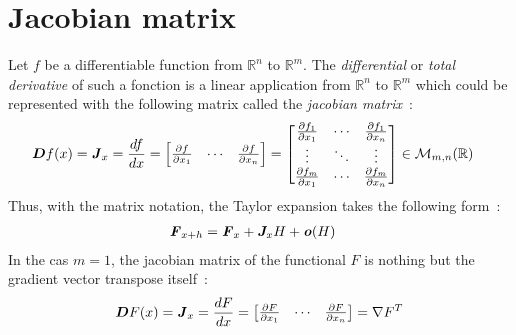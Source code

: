 \section{Jacobian matrix}
Let $f$ be a differentiable function from $\mathbb{R}^n$ to $\mathbb{R}^m$. The \emph{differential} or \emph{total derivative} of such a fonction is a linear application from $\mathbb{R}^n$ to $\mathbb{R}^m$ which could be represented with the following matrix called the \emph{jacobian matrix}~:
\begin{align}
	&\boldsymbol{D}f(x) = \boldsymbol{\mathit{J}}_x = \frac{df}{dx} =
	\begin{bmatrix}
		\frac{\partial f}{\partial x_1}&\cdots&\frac{\partial f}{\partial x_n}
	\end{bmatrix}=
	\begin{bmatrix}
		\frac{\partial f_1}{\partial x_1} & \cdots & \frac{\partial f_1}{\partial x_n} \\
		\vdots & \ddots & \vdots \\
		\frac{\partial f_m}{\partial x_1} & \cdots & \frac{\partial f_m}{\partial x_n}
	\end{bmatrix}
	\in\mathcal{M}_{m,n}(\mathbb{R})
\end{align}
Thus, with the matrix notation, the Taylor expansion takes the following form~:
\begin{align}
	&\boldsymbol{\mathit{F}}_{x+h} = \boldsymbol{\mathit{F}}_{x} +  \boldsymbol{J}_x H + \boldsymbol{\mathit{o}}(H)
\end{align}
In the cas $m=1$, the jacobian matrix of the functional $F$ is nothing but the gradient vector transpose itself~:
\begin{align}
	\boldsymbol{D}F(x) = \boldsymbol{\mathit{J}}_x = \frac{dF}{dx} =
	\begin{bmatrix}
		\frac{\partial F}{\partial x_1}& \cdots&\frac{\partial F}{\partial x_n}
	\end{bmatrix} = \nabla F^T
\end{align}


